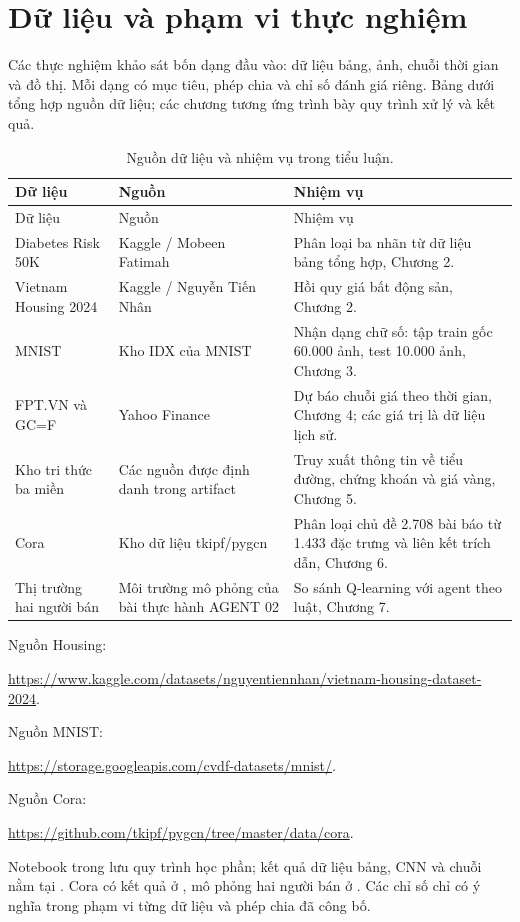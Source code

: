 \chapter*{Dữ liệu và phạm vi thực nghiệm}
Các thực nghiệm khảo sát bốn dạng đầu vào: dữ liệu bảng, ảnh, chuỗi thời gian và đồ thị. Mỗi dạng có mục tiêu, phép chia và chỉ số đánh giá riêng. Bảng dưới tổng hợp nguồn dữ liệu; các chương tương ứng trình bày quy trình xử lý và kết quả.
\begingroup\small{}
\begin{longtable}{p{3cm}p{5cm}p{6cm}}\caption{Nguồn dữ liệu và nhiệm vụ trong tiểu luận.}\\\toprule Dữ liệu & Nguồn & Nhiệm vụ\\\midrule\endfirsthead\toprule Dữ liệu & Nguồn & Nhiệm vụ\\\midrule\endhead
Diabetes Risk 50K & Kaggle / Mobeen Fatimah & Phân loại ba nhãn từ dữ liệu bảng tổng hợp, Chương 2.\\
Vietnam Housing 2024 & Kaggle / Nguyễn Tiến Nhân & Hồi quy giá bất động sản, Chương 2.\\
MNIST & Kho IDX của MNIST & Nhận dạng chữ số: tập train gốc 60.000 ảnh, test 10.000 ảnh, Chương 3.\\
FPT.VN và GC=F & Yahoo Finance & Dự báo chuỗi giá theo thời gian, Chương 4; các giá trị là dữ liệu lịch sử.\\
Kho tri thức ba miền & Các nguồn được định danh trong artifact & Truy xuất thông tin về tiểu đường, chứng khoán và giá vàng, Chương 5.\\
Cora & Kho dữ liệu tkipf/pygcn & Phân loại chủ đề 2.708 bài báo từ 1.433 đặc trưng và liên kết trích dẫn, Chương 6.\\
Thị trường hai người bán & Môi trường mô phỏng của bài thực hành AGENT 02 & So sánh Q-learning với agent theo luật, Chương 7.\\\bottomrule\end{longtable}
Nguồn Housing: \par\noindent\url{https://www.kaggle.com/datasets/nguyentiennhan/vietnam-housing-dataset-2024}.\par  Nguồn MNIST: \par\noindent\url{https://storage.googleapis.com/cvdf-datasets/mnist/}.\par  Nguồn Cora: \par\noindent\url{https://github.com/tkipf/pygcn/tree/master/data/cora}.\par
\endgroup

Notebook trong  lưu quy trình học phần; kết quả dữ liệu bảng, CNN và chuỗi nằm tại . Cora có kết quả ở , mô phỏng hai người bán ở . Các chỉ số chỉ có ý nghĩa trong phạm vi từng dữ liệu và phép chia đã công bố.
